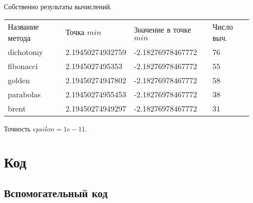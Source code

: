 Собственно результаты вычислений.

\begin{tabular}{ l l l l }
        Название метода & Точка $min$ & Значение в точке $min$ & Число выч.\\
        dichotomy & 2.19450274932759 & -2.18276978467772 &  76\\
        fibonacci & 2.1945027495353 & -2.18276978467772 & 55\\
        golden & 2.19450274947802 & -2.18276978467772 & 58\\
        parabolas & 2.19450274955453 & -2.18276978467772 & 38\\
        brent & 2.19450274949297 & -2.18276978467772 & 31\\
\end{tabular}

Точность $epsilon = 1e-11$.

\newpage
\section {Код}

\subsection {Вспомогательный код}

